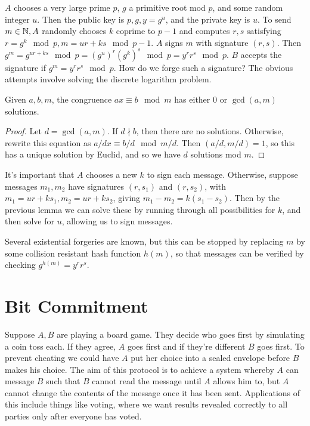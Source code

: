 \documentclass[10pt,a4paper]{article}
\begin{document}
$A$ chooses a very large prime $p$, $g$ a primitive root mod $p$, and some random integer $u$. Then the public key is $p, g, y=g^u$, and the private key is $u$. To send $m \in \mathbb{N}, A$ randomly chooses $k$ coprime to $p-1$ and computes $r,s$ satisfying $r = g^k \mod p, m = ur+ks \mod p-1$. $A$ signs $m$ with signature $(r,s)$. Then $g^m = g^{ur+ks}\mod p = (g^u)^r(g^k)^s \mod p = y^r r^s \mod p$. $B$ accepts the signature if $g^m = y^rr^s \mod p$. How do we forge such a signature? The obvious attempts involve solving the discrete logarithm problem.

\begin{lemma}
Given $a,b,m$, the congruence $ax \equiv b \mod m$ has either $0$ or $\gcd(a,m)$ solutions. 
\end{lemma}
\begin{proof}
Let $d = \gcd(a,m)$. If $d\nmid b$, then there are no solutions. Otherwise, rewrite this equation as $a/d x \equiv b/d \mod m/d$. Then $(a/d,m/d) = 1$, so this has a unique solution by Euclid, and so we have $d$ solutions mod $m$. 
\end{proof}
It's important that $A$ chooses a new $k$ to sign each message. Otherwise, suppose messages $m_1, m_2$ have signatures $(r, s_1)$ and $(r, s_2)$, with $m_1 = ur+ks_1, m_2 = ur+ks_2$, giving $m_1-m_2 = k(s_1-s_2)$. Then by the previous lemma we can solve these by running through all possibilities for $k$, and then solve for $u$, allowing us to sign messages.

Several existential forgeries are known, but this can be stopped by replacing $m$ by some collision resistant hash function $h(m)$, so that messages can be verified by checking $g^{h(m)} = y^rr^s$.

\section{Bit Commitment}
Suppose $A,B$ are playing a board game. They decide who goes first by simulating a coin toss each. If they agree, $A$ goes first and if they're different $B$ goes first. To prevent cheating we could have $A$ put her choice into a sealed envelope before $B$ makes his choice. The aim of this protocol is to achieve a system whereby $A$ can message $B$ such that $B$ cannot read the message until $A$ allows him to, but $A$ cannot change the contents of the message once it has been sent. Applications of this include things like voting, where we want results revealed correctly to all parties only after everyone has voted.
\end{document}
